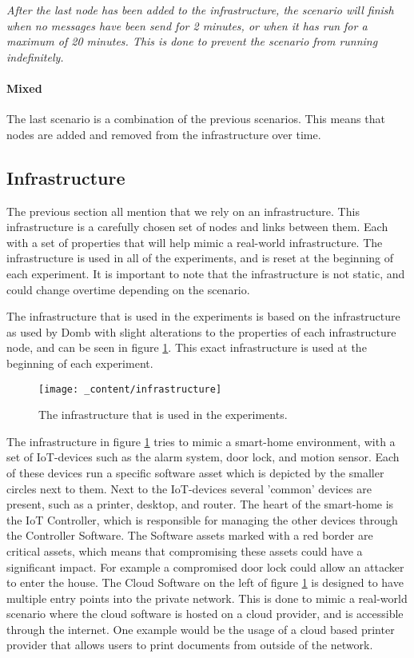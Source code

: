 \textit{After the last node has been added to the infrastructure, the scenario will finish when no messages have been send for 2 minutes, or when it has run for a maximum of 20 minutes. This is done to prevent the scenario from running indefinitely.}

\paragraph*{Mixed}
The last scenario is a combination of the previous scenarios. This means that nodes are added and removed from the infrastructure over time. 

\subsection{Infrastructure}
\label{ssec:infrastructure}
The previous section all mention that we rely on an infrastructure. This infrastructure is a carefully chosen set of nodes and links between them. Each with a set of properties that will help mimic a real-world infrastructure. The infrastructure is used in all of the experiments, and is reset at the beginning of each experiment. It is important to note that the infrastructure is not static, and could change overtime depending on the scenario.

The infrastructure that is used in the experiments is based on the infrastructure as used by Domb \cite{domb2019smart} with slight alterations to the properties of each infrastructure node, and can be seen in figure \ref{fig:infrastructure}. This exact infrastructure is used at the beginning of each experiment.

\begin{figure}[H]
    \centering
    \texttt{[image: \_content/infrastructure]}
    \caption{The infrastructure that is used in the experiments.}
    \label{fig:infrastructure}
\end{figure}

The infrastructure in figure \ref{fig:infrastructure} tries to mimic a smart-home environment, with a set of IoT-devices such as the alarm system, door lock, and motion sensor. Each of these devices run a specific software asset which is depicted by the smaller circles next to them. Next to the IoT-devices several 'common' devices are present, such as a printer, desktop, and router. The heart of the smart-home is the IoT Controller, which is responsible for managing the other devices through the Controller Software. The Software assets marked with a red border are critical assets, which means that compromising these assets could have a significant impact. For example a compromised door lock could allow an attacker to enter the house. The Cloud Software on the left of figure \ref{fig:infrastructure} is designed to have multiple entry points into the private network. This is done to mimic a real-world scenario where the cloud software is hosted on a cloud provider, and is accessible through the internet. One example would be the usage of a cloud based printer provider that allows users to print documents from outside of the network.


